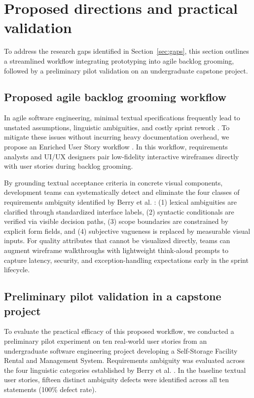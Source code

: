 \section{Proposed directions and practical validation}
\label{sec:directions}

To address the research gaps identified in Section~\ref{sec:gaps}, this section outlines a streamlined workflow integrating prototyping into agile backlog grooming, followed by a preliminary pilot validation on an undergraduate capstone project.

\subsection{Proposed agile backlog grooming workflow}
In agile software engineering, minimal textual specifications frequently lead to unstated assumptions, linguistic ambiguities, and costly sprint rework \cite{inayat2015systematic}. To mitigate these issues without incurring heavy documentation overhead, we propose an Enriched User Story workflow \cite{acm2022proposal}. In this workflow, requirements analysts and UI/UX designers pair low-fidelity interactive wireframes directly with user stories during backlog grooming. 

By grounding textual acceptance criteria in concrete visual components, development teams can systematically detect and eliminate the four classes of requirements ambiguity identified by Berry et al. \cite{berry2003contract}: (1) lexical ambiguities are clarified through standardized interface labels, (2) syntactic conditionals are verified via visible decision paths, (3) scope boundaries are constrained by explicit form fields, and (4) subjective vagueness is replaced by measurable visual inputs. For quality attributes that cannot be visualized directly, teams can augment wireframe walkthroughs with lightweight think-aloud prompts \cite{abad2018loud} to capture latency, security, and exception-handling expectations early in the sprint lifecycle.

\subsection{Preliminary pilot validation in a capstone project}
To evaluate the practical efficacy of this proposed workflow, we conducted a preliminary pilot experiment on ten real-world user stories from an undergraduate software engineering project developing a Self-Storage Facility Rental and Management System. Requirements ambiguity was evaluated across the four linguistic categories established by Berry et al. \cite{berry2003contract}. In the baseline textual user stories, fifteen distinct ambiguity defects were identified across all ten statements (100\% defect rate). 

